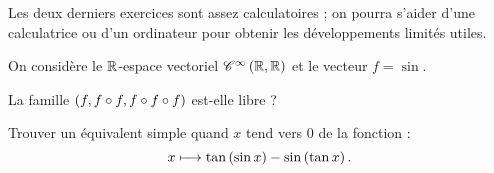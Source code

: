 \begin{corr}
\end{corr}

\begin{rem}
Les deux derniers exercices sont assez calculatoires ; on pourra s'aider d'une calculatrice ou d'un ordinateur pour obtenir les développements limités utiles.
\end{rem}

\begin{exo}[Exercice 18]
On considère le \(\mathbb{R}\)-espace vectoriel \(\mathscr{C}^{\infty}\left(\mathbb{R},\mathbb{R}\right)\) et le vecteur \(f=\sin\).

La famille \(\left(f,f\circ f,f\circ f\circ f\right)\) est-elle libre ?
\end{exo}

\begin{corr}
\end{corr}

\begin{exo}[Exercice 19]
Trouver un équivalent simple quand \(x\) tend vers \(0\) de la fonction : \[x\longmapsto\tan\left(\sin x\right)-\sin\left(\tan x\right).\]
\end{exo}

\begin{corr}
\end{corr}